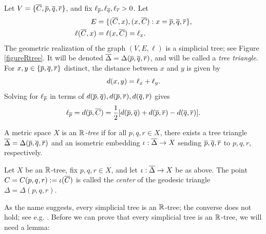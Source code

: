 \begin{example}
\label{exampletreetriangle}
Let $V = \{\overline C,\overline p,\overline q,\overline r\}$, and fix $\ell_{\overline p},\ell_{\overline q},\ell_{\overline r} > 0$. Let 
\begin{align*}
E &= \{(\overline C,x), (x,\overline C) : x = \overline p,\overline q,\overline r\},\\
\ell(\overline C,x) &= \ell(x,\overline C) = \ell_x.
\end{align*} 
The geometric realization of the graph $(V,E,\ell)$ is a simplicial tree; see Figure \ref{figureRtree}. It will be denoted $\overline \Delta = \Delta(\overline p,\overline q,\overline r)$, and will be called a \emph{tree triangle}. For $x,y\in\{\overline p,\overline q,\overline r\}$ distinct, the distance between $x$ and $y$ is given by
\[
d(x,y) = \ell_x + \ell_y.
\]
Solving for $\ell_{\overline p}$ in terms of $d(\overline p,\overline q),d(\overline p,\overline r),d(\overline q,\overline r)$ gives
\begin{equation}
\label{gromovprecursor}
\ell_{\overline p} = d(\overline p,\overline C) = \frac12[d(\overline p,\overline q) + d(\overline p,\overline r) - d(\overline q,\overline r)].
\end{equation}
\end{example}

\begin{definition}
\label{definitionRtree}
A metric space $X$ is an \emph{$\R$-tree} if for all $p,q,r\in X$, there exists a tree triangle $\overline\Delta = \Delta(\overline p,\overline q,\overline r)$ and an isometric embedding $\iota:\overline\Delta\to X$ sending $\overline p,\overline q,\overline r$ to $p,q,r$, respectively.
\end{definition}
\begin{definition}
\label{definitioncenterRtree}
Let $X$ be an $\R$-tree, fix $p,q,r\in X$, and let $\iota:\overline\Delta\to X$ be as above. The point $C = C(p,q,r) := \iota(\overline C)$ is called the \emph{center} of the geodesic triangle $\Delta = \Delta(p,q,r)$.
\end{definition}

As the name suggests, every simplicial tree is an $\R$-tree; the converse does not hold; see e.g. \cite[Example on p.50]{Chiswell}. Before we can prove that every simplicial tree is an $\R$-tree, we will need a lemma:

